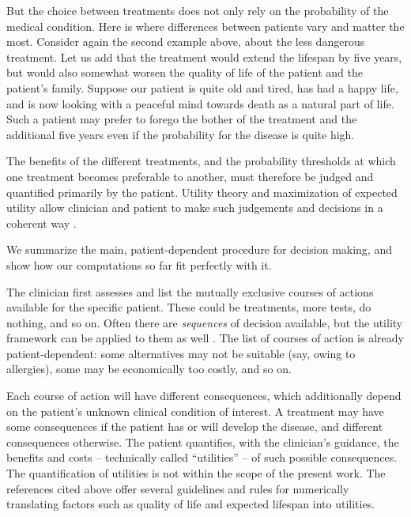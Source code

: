 \documentclass[utf8]{FrontiersinHarvard} %
\renewcommand*{\|}[1][]{\nonscript\:#1\vert\nonscript\:\mathopen{}}
\begin{document}
But the choice between treatments does not only rely on the probability of the medical condition. Here is where differences between patients vary and matter the most. Consider again the second example above, about the less dangerous treatment. Let us add that the treatment would extend the lifespan by five years, but would also somewhat worsen the quality of life of the patient and the patient's family. Suppose our patient is quite old and tired, has had a happy life, and is now looking with a peaceful mind towards death as a natural part of life. Such a patient may prefer to forego the bother of the treatment and the additional five years even if the probability for the disease is quite high.

The benefits of the different treatments, and the probability thresholds at which one treatment becomes preferable to another, must therefore be judged and quantified primarily by the patient. Utility theory and maximization of expected utility allow clinician and patient to make such judgements and decisions in a coherent way \citetext{\citealp{soxetal1988_r2013,huninketal2001_r2014}; see also the clear and charming exposition by \citealp{lindley1971_r1988}, and \citealp{ohaganetal2006}}.

We summarize the main, patient-dependent procedure for decision making, and show how our computations so far fit perfectly with it.

The clinician first assesses and list the mutually exclusive courses of actions available for the specific patient. These could be treatments, more tests, do nothing, and so on. Often there are \emph{sequences} of decision available, but the utility framework can be applied to them as well \citetext{see references above and \citealp{raiffa1968_r1970}}. The list of courses of action is already patient-dependent: some alternatives may not be suitable (say, owing to allergies), some may be economically too costly, and so on.

Each course of action will have different consequences, which additionally depend on the patient's unknown clinical condition of interest. A treatment may have some consequences if the patient has or will develop the disease, and different consequences otherwise. The patient quantifies, with the clinician's guidance, the benefits and costs -- technically called \enquote{utilities} -- of such possible consequences. The quantification of utilities is not within the scope of the present work. The references cited above offer several guidelines and rules for numerically translating factors such as quality of life and expected lifespan into utilities.
\end{document}
